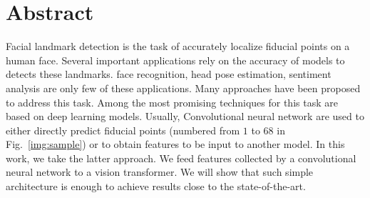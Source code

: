 \section{Abstract}\label{sect:abstract}
Facial landmark detection is the task of accurately localize fiducial points on a human face. Several important applications rely on the accuracy of models to detects these landmarks. face recognition, head pose estimation, sentiment analysis are only few of these applications. Many approaches have been proposed to address this task. Among the most promising techniques for this task are based on deep learning models. Usually, Convolutional neural network are used to either directly predict fiducial points (numbered from $1$ to $68$ in Fig.~\ref{img:sample}) or to obtain features to be input to another model. In this work, we take the latter approach. We feed features collected by a convolutional neural network to a vision transformer. We will show that such simple architecture is enough to achieve results close to the state-of-the-art.  


